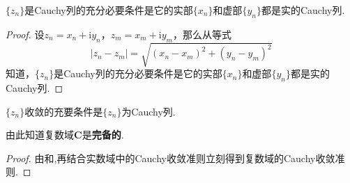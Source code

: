 \documentclass[../../main.tex]{subfiles}
\begin{document}
\begin{theorem}\label{theorem:复数Cauchy列充要条件}
\(\{ z_n \}\)是Cauchy列的充分必要条件是它的实部\(\{ x_n \}\)和虚部\(\{ y_n \}\)都是实的Cauchy列.
\end{theorem}
\begin{proof}
设\(z_n = x_n + \mathrm{i}y_n\)，\(z_m = x_m + \mathrm{i}y_m\)，那么从等式
\[
| z_n - z_m | = \sqrt{(x_n - x_m)^2 + (y_n - y_m)^2}
\]
知道，\(\{ z_n \}\)是Cauchy列的充分必要条件是它的实部\(\{ x_n \}\)和虚部\(\{ y_n \}\)都是实的Cauchy列.
\end{proof}

\begin{theorem}[复数域的Cauchy收敛准则]\label{theorem:复数域的Cauchy收敛准则}
\(\{ z_n \}\)收敛的充要条件是\(\{ z_n \}\)为Cauchy列.
\end{theorem}
\begin{note}
由此知道复数域\(\mathbf{C}\)是\textbf{完备的}.
\end{note}
\begin{proof}
由和,再结合实数域中的Cauchy收敛准则立刻得到复数域的Cauchy收敛准则.
\end{proof}
\end{document}
